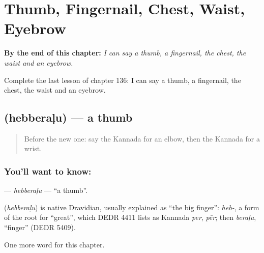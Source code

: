 
\chapter{Thumb, Fingernail, Chest, Waist, Eyebrow}
\label{ch:ka-thumb-fingernail-chest-waist-eyebrow}

\begin{chapteropening}
\textbf{By the end of this chapter:} \emph{I can say a thumb, a fingernail, the chest, the waist and an eyebrow.}

Complete the last lesson of chapter 136: I can say a thumb, a fingernail, the chest, the waist and an eyebrow.
\end{chapteropening}

\section[\texorpdfstring{\kn{ಹೆಬ್ಬೆರಳು} (hebberaḷu)}{ಹೆಬ್ಬೆರಳು (hebberaḷu)}]{ (hebberaḷu) — a thumb}

\label{lesson:KA-C136-hebberalu}



\begin{quote}
Before the new one: say the Kannada for an elbow, then the Kannada for a wrist.
\end{quote}

\subsection*{You'll want to know: }
\textbf{} — \emph{hebberaḷu} — \textquotedblleft{}a thumb\textquotedblright{}.

\begin{cousinweb}
\textbf{} (\emph{hebberaḷu}) is native Dravidian, usually explained as \textquotedblleft{}the big finger\textquotedblright{}: \emph{heb-}, a form of the root for \textquotedblleft{}great\textquotedblright{}, which DEDR 4411 lists as Kannada \emph{per}, \emph{pēr}; then \emph{beraḷu}, \textquotedblleft{}finger\textquotedblright{} (DEDR 5409).
\end{cousinweb}

\begin{grammarlens}[title={What you've built}]
One more word for this chapter.
\end{grammarlens}

